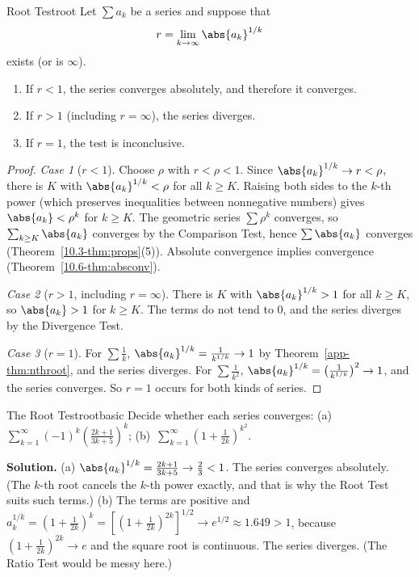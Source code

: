 \documentclass[11pt]{article}
\begin{document}
\begin{thm}{Root Test}{root}
Let $\sum a_k$ be a series and suppose that
\[
r=\lim_{k\to\infty}\abs{a_k}^{1/k}
\]
exists (or is $\infty$).
\begin{enumerate}
  \item If $r<1$, the series converges absolutely, and therefore it converges.
  \item If $r>1$ (including $r=\infty$), the series diverges.
  \item If $r=1$, the test is inconclusive.
\end{enumerate}
\end{thm}
\begin{proof}
\emph{Case 1} ($r<1$). Choose $\rho$ with $r<\rho<1$. Since $\abs{a_k}^{1/k}\to r<\rho$, there is $K$ with $\abs{a_k}^{1/k}<\rho$ for all $k\ge K$. Raising both sides to the $k$-th power (which preserves inequalities between nonnegative numbers) gives $\abs{a_k}<\rho^k$ for $k\ge K$. The geometric series $\sum\rho^k$ converges, so $\sum_{k\ge K}\abs{a_k}$ converges by the Comparison Test, hence $\sum\abs{a_k}$ converges (Theorem~\ref{10.3-thm:props}(5)). Absolute convergence implies convergence (Theorem~\ref{10.6-thm:absconv}).

\emph{Case 2} ($r>1$, including $r=\infty$). There is $K$ with $\abs{a_k}^{1/k}>1$ for all $k\ge K$, so $\abs{a_k}>1$ for $k\ge K$. The terms do not tend to $0$, and the series diverges by the Divergence Test.

\emph{Case 3} ($r=1$). For $\sum\frac1k$, $\abs{a_k}^{1/k}=\frac1{k^{1/k}}\to1$ by Theorem~\ref{app-thm:nthroot}, and the series diverges. For $\sum\frac1{k^2}$, $\abs{a_k}^{1/k}=\left(\frac1{k^{1/k}}\right)^2\to1$, and the series converges. So $r=1$ occurs for both kinds of series.
\end{proof}

\begin{exmp}{The Root Test}{rootbasic}
Decide whether each series converges: (a)~$\displaystyle\sum_{k=1}^\infty(-1)^k\left(\frac{2k+1}{3k+5}\right)^k$; \quad (b)~$\displaystyle\sum_{k=1}^\infty\left(1+\frac1{2k}\right)^{k^2}$.

\textbf{Solution.} (a) $\abs{a_k}^{1/k}=\frac{2k+1}{3k+5}\to\frac23<1$. The series converges absolutely. (The $k$-th root cancels the $k$-th power exactly, and that is why the Root Test suits such terms.)
(b) The terms are positive and $a_k^{1/k}=\left(1+\frac1{2k}\right)^k=\left[\left(1+\frac1{2k}\right)^{2k}\right]^{1/2}\to e^{1/2}\approx1.649>1$, because $\left(1+\frac1{2k}\right)^{2k}\to e$ and the square root is continuous. The series diverges. (The Ratio Test would be messy here.)
\end{exmp}
\end{document}
